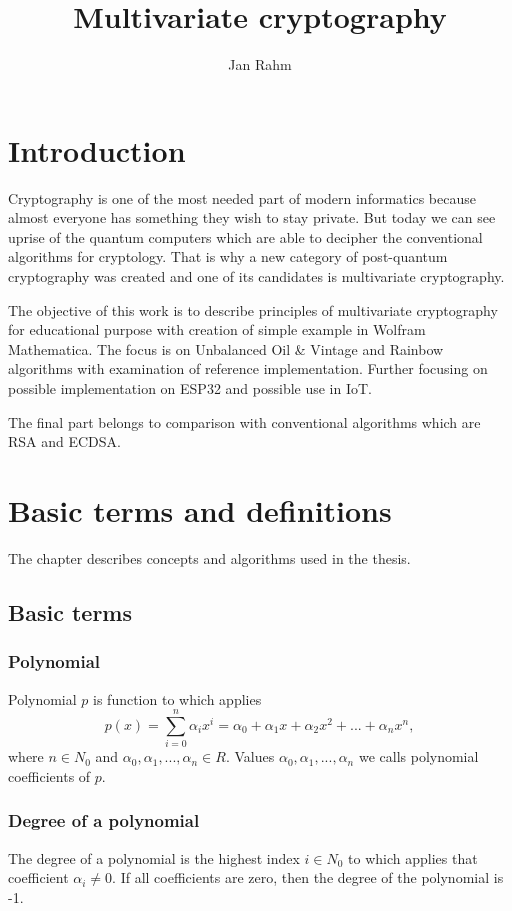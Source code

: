 \documentclass[thesis=M,english]{FITthesis}[2019/12/23]
\title{Multivariate cryptography}
\author{Jan Rahm} %
\begin{document}

\chapter{Introduction}
Cryptography is one of the most needed part of modern informatics because almost everyone has something they wish to stay private. But today we can see uprise of the quantum computers which are able to decipher the conventional algorithms for cryptology. That is why a new category of post-quantum cryptography was created and one of its candidates is multivariate cryptography.

The objective of this work is to describe principles of multivariate cryptography for educational purpose with creation of simple example in Wolfram Mathematica. The focus is on Unbalanced Oil \& Vintage and Rainbow algorithms with examination of reference implementation. Further focusing on possible implementation on ESP32 and possible use in IoT.

The final part belongs to comparison with conventional algorithms which are RSA and ECDSA.

\chapter{Basic terms and definitions}
The chapter describes concepts and algorithms used in the thesis.

\section{Basic terms}
\subsection{Polynomial}
Polynomial $p$ is function to which applies
\[
	p(x) = \sum\limits_{i=0}^n {\alpha_ix^i} = \alpha_0 + \alpha_1x + \alpha_2x^2 + ... + \alpha_nx^n,
\]
where $n \in N_0$ and $\alpha_0, \alpha_1, ..., \alpha_n \in R$. Values $\alpha_0, \alpha_1, ..., \alpha_n$ we calls polynomial coefficients of $p$.  

\subsection{Degree of a polynomial}
The degree of a polynomial is the highest index $i \in N_0$ to which applies that coefficient $\alpha_i \ne 0$. If all coefficients are zero, then the degree of the polynomial is -1.
\end{document}
